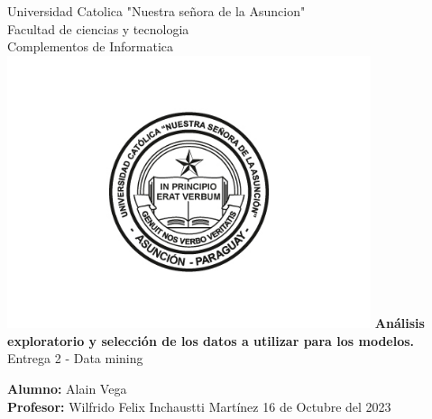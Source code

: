 \documentclass[12pt, letterpaper]{article}
\begin{document}
\begin{titlepage}
  \begin{center}
      \Large{Universidad Catolica "Nuestra señora de la Asuncion" \\
      Facultad de ciencias y tecnologia \\
      Complementos de Informatica}
      \includegraphics[width=0.8\textwidth]{UcaLogo.jpg}
      \LARGE{\textbf{Análisis exploratorio y selección de los datos 
      a utilizar para los modelos.}} \\
      \Large{Entrega 2 - Data mining}
      \vspace{1cm}
  \end{center}
      \large
      \textbf{Alumno: }Alain Vega \\
      \textbf{Profesor: }Wilfrido Felix Inchaustti Martínez
      \vfill
      \hfill{16 de Octubre del 2023}
\end{titlepage}


\newpage
\tableofcontents %
\newpage

\end{document}
